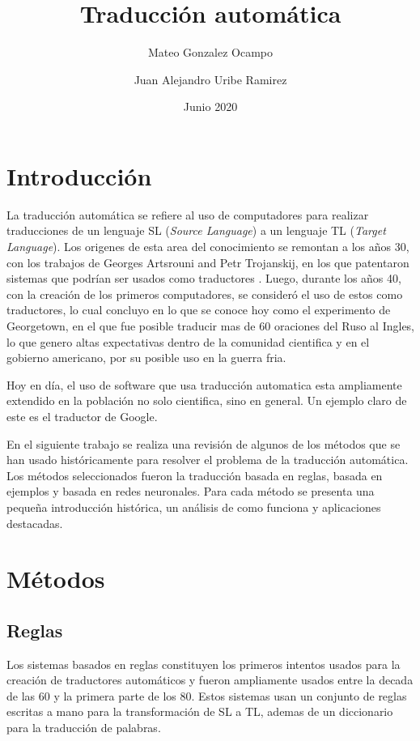 \documentclass[12pt, letterpaper]{article}
\title{Traducción automática}
\author{Mateo Gonzalez Ocampo \and Juan Alejandro Uribe Ramirez}
\date{Junio 2020}
\begin{document}
    \maketitle
    \begin{multicols}{2}
        \section{Introducción}
            La traducción automática se refiere al uso de computadores para realizar traducciones de un lenguaje SL (\textit{Source Language}) 
            a un lenguaje TL (\textit{Target Language}). Los origenes de esta area del conocimiento se remontan a los años 30, con los trabajos
            de Georges Artsrouni and Petr Trojanskij, en los que patentaron sistemas que podrían ser usados como traductores \cite{HUTCHINS1995431}.
            Luego, durante los años 40, con la creación de los primeros computadores, se consideró el uso de estos como traductores, lo cual concluyo
            en lo que se conoce hoy como el experimento de Georgetown\cite{Georgetown}, en el que fue posible traducir mas de 60 oraciones del Ruso
            al Ingles, lo que genero altas expectativas dentro de la comunidad cientifica y en el gobierno americano, por su posible uso en la guerra
            fria.

            Hoy en día, el uso de software que usa traducción automatica esta ampliamente extendido en la población no solo cientifica, sino en general.
            Un ejemplo claro de este es el traductor de Google.
 
            En el siguiente trabajo se realiza una revisión de algunos de los métodos que se han usado históricamente para resolver el problema de la 
            traducción automática. Los métodos seleccionados fueron la traducción basada en reglas, basada en ejemplos y basada en redes neuronales.
            Para cada método se presenta una pequeña introducción histórica, un análisis de como funciona y aplicaciones destacadas.
        \section{Métodos}
            \subsection{Reglas}
                Los sistemas basados en reglas constituyen los primeros intentos usados para la creación
                de traductores automáticos y fueron ampliamente usados entre la decada de las 60 y la 
                primera parte de los 80. Estos sistemas usan un conjunto de reglas escritas a mano para la
                transformación de SL a TL, ademas de un diccionario para la traducción de palabras. 


\end{multicols}
\end{document}
